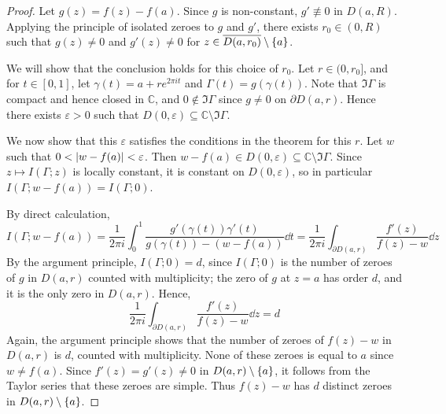 \begin{proof}
	Let \( g(z) = f(z) - f(a) \).
	Since \( g \) is non-constant, \( g' \not\equiv 0 \) in \( D(a,R) \).
	Applying the principle of isolated zeroes to \( g \) and \( g' \), there exists \( r_0 \in (0,R) \) such that \( g(z) \neq 0 \) and \( g'(z) \neq 0 \) for \( z \in \overline{D(a,r_0)} \setminus \qty{a} \).

	We will show that the conclusion holds for this choice of \( r_0 \).
	Let \( r \in (0,r_0] \), and for \( t \in [0,1] \), let \( \gamma(t) = a + re^{2\pi i t} \) and \( \Gamma(t) = g(\gamma(t)) \).
	Note that \( \Im \Gamma \) is compact and hence closed in \( \mathbb C \), and \( 0 \not\in \Im \Gamma \) since \( g \neq 0 \) on \( \partial D(a,r) \).
	Hence there exists \( \varepsilon > 0 \) such that \( D(0,\varepsilon) \subseteq \mathbb C \setminus \Im \Gamma \).

	We now show that this \( \varepsilon \) satisfies the conditions in the theorem for this \( r \).
	Let \( w \) such that \( 0 < \abs{w-f(a)} < \varepsilon \).
	Then \( w-f(a) \in D(0,\varepsilon) \subseteq \mathbb C \setminus \Im \Gamma \).
	Since \( z \mapsto I(\Gamma;z) \) is locally constant, it is constant on \( D(0,\varepsilon) \), so in particular \( I(\Gamma;w-f(a)) = I(\Gamma;0) \).

	By direct calculation,
	\[ I(\Gamma;w-f(a)) = \frac{1}{2\pi i} \int_0^1 \frac{g'(\gamma(t)) \gamma'(t)}{g(\gamma(t)) - (w-f(a))} \dd{t} = \frac{1}{2\pi i} \int_{\partial D(a,r)} \frac{f'(z)}{f(z) - w} \dd{z} \]
	By the argument principle, \( I(\Gamma;0) = d \), since \( I(\Gamma;0) \) is the number of zeroes of \( g \) in \( D(a,r) \) counted with multiplicity; the zero of \( g \) at \( z = a \) has order \( d \), and it is the only zero in \( D(a,r) \).
	Hence,
	\[ \frac{1}{2\pi i} \int_{\partial D(a,r)} \frac{f'(z)}{f(z) - w} \dd{z} = d \]
	Again, the argument principle shows that the number of zeroes of \( f(z) - w \) in \( D(a,r) \) is \( d \), counted with multiplicity.
	None of these zeroes is equal to \( a \) since \( w \neq f(a) \).
	Since \( f'(z) = g'(z) \neq 0 \) in \( D(a,r) \setminus \qty{a} \), it follows from the Taylor series that these zeroes are simple.
	Thus \( f(z) - w \) has \( d \) distinct zeroes in \( D(a,r) \setminus \qty{a} \).
\end{proof}

